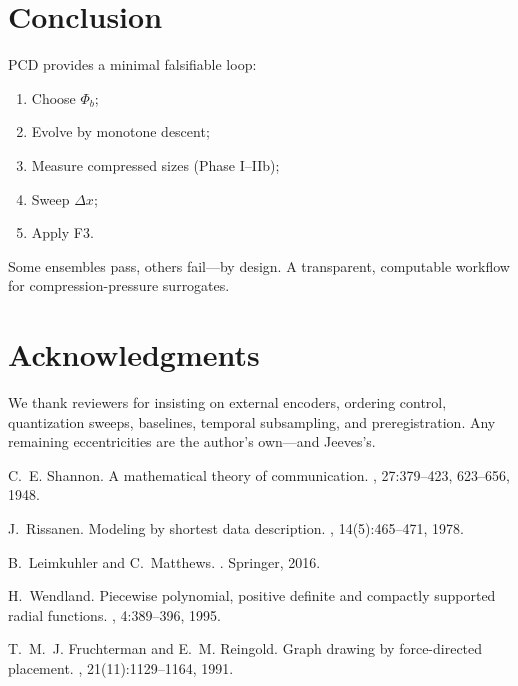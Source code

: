 \documentclass[11pt,a4paper]{article}
\numberwithin{equation}{section}
\newcommand{\phib}{\Phi_b}
\begin{document}
\section{Conclusion}
PCD provides a minimal falsifiable loop:
\begin{enumerate}[label=(\arabic*)]
\item Choose $\phib$;
\item Evolve by monotone descent;
\item Measure compressed sizes (Phase I–IIb);
\item Sweep $\Delta x$;
\item Apply F3.
\end{enumerate}
Some ensembles pass, others fail—by design.  
A transparent, computable workflow for compression-pressure surrogates.

\section*{Acknowledgments}
We thank reviewers for insisting on external encoders, ordering control, quantization sweeps, baselines, temporal subsampling, and preregistration.  
Any remaining eccentricities are the author’s own—and Jeeves’s.


\begin{thebibliography}{10}

C.~E. Shannon.
\newblock A mathematical theory of communication.
, 27:379--423, 623--656, 1948.

J.~Rissanen.
\newblock Modeling by shortest data description.
, 14(5):465--471, 1978.

B.~Leimkuhler and C.~Matthews.
.
\newblock Springer, 2016.

H.~Wendland.
\newblock Piecewise polynomial, positive definite and compactly supported radial functions.
, 4:389--396, 1995.

T.~M.~J. Fruchterman and E.~M. Reingold.
\newblock Graph drawing by force-directed placement.
, 21(11):1129--1164, 1991.

\end{thebibliography}
\end{document}
